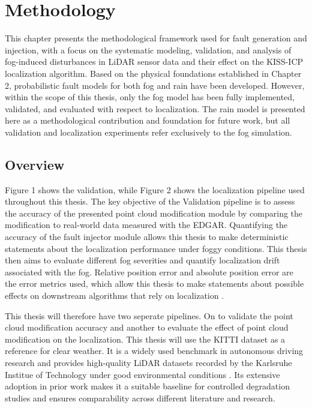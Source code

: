


\chapter{Methodology}
\label{ch:methodology}
This chapter presents the methodological framework used for fault generation and injection, with a focus on the systematic modeling, validation, and analysis of fog-induced disturbances in LiDAR sensor data and their effect on the KISS-ICP localization algorithm.
Based on the physical foundations established in Chapter 2, probabilistic fault models for both fog and rain have been developed. However, within the scope of this thesis, only the fog model has been fully implemented, validated, and evaluated with respect to localization. The rain model is presented here as a methodological contribution and foundation for future work, but all validation and localization experiments refer exclusively to the fog simulation.

\section{Overview} 
Figure 1 shows the validation, while Figure 2 shows the localization pipeline used throughout this thesis. The key objective of the Validation pipeline is to assess the accuracy of the presented point cloud modification module by comparing the modification to real-world data measured with the EDGAR. Quantifying the accuracy of the fault injector module allows this thesis to make deterministic statements about the localization performance under foggy conditions. This thesis then aims to evaluate different fog severities and quantify localization drift associated with the fog. Relative position error and absolute position error are the error metrics used, which allow this thesis to make statements about possible effects on downstream algorithms that rely on localization \cite{goelles_fault_2020}. %

This thesis will therefore have two seperate pipelines. 
On to validate the point cloud modification accuracy and another to evaluate the effect of point cloud modification on the localization. 
This thesis will use the KITTI dataset as a reference for clear weather. It is a widely used benchmark in autonomous driving research and provides high-quality LiDAR datasets recorded by the Karlsruhe Institue of Technology under good environmental conditions \cite{noauthor_kitti_nodate}. Its extensive adoption in prior work makes it a suitable baseline for controlled degradation studies and ensures comparability across different literature and research.


